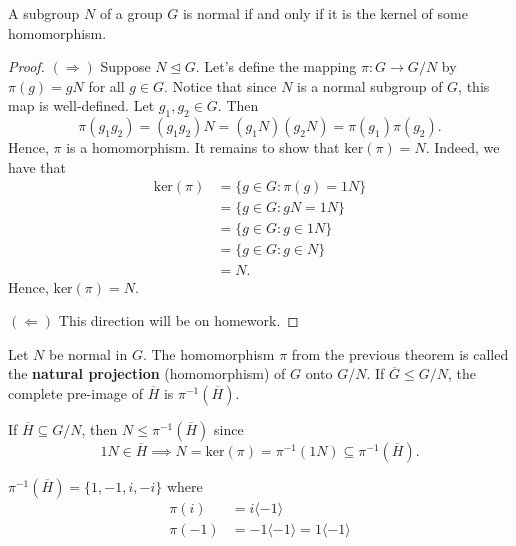 \begin{theorem}[Big!]
    A subgroup \( N \) of a group \( G  \) is normal if and only if it is the kernel of some homomorphism.
\end{theorem}
\begin{proof}
\( (\Longrightarrow) \) Suppose \( N \trianglelefteq G  \). Let's define the mapping \( \pi : G \to G /N  \) by \( \pi (g) = g N  \) for all \( g \in G  \). Notice that since \( N  \) is a normal subgroup of \( G  \), this map is well-defined. Let \( {g}_{1}, {g}_{2} \in G  \). Then 
\[  \pi({g}_{1} {g}_{2}) = ({g}_{1} {g}_{2}) N = ({g}_{1}N) ({g}_{2} N ) = \pi({g}_{1}) \pi({g}_{2}). \]
Hence, \( \pi  \) is a homomorphism. It remains to show that \( \text{ker}(\pi) = N  \). Indeed, we have that 
\begin{align*}
    \text{ker}(\pi) &= \{  g \in G : \pi(g) = 1N \}  \\
                    &= \{ g \in G : g N = 1 N  \}  \\
                    &= \{ g \in G : g \in 1N \}  \\
                    &= \{ g \in G : g \in N  \}  \\
                    &= N. 
\end{align*}
Hence, \( \text{ker}(\pi) = N  \).

\( (\Longleftarrow) \) This direction will be on homework.
\end{proof}

\begin{definition}
    Let \( N  \) be normal in \( G  \). The homomorphism \( \pi  \) from the previous theorem is called the \textbf{natural projection} (homomorphism) of \( G  \) onto \( G / N  \). If \( \overline{G} \leq G / N  \), the complete pre-image of \( \overline{H} \) is \( \pi^{-1}(\overline{H}) \).
\end{definition}

\begin{remark}
    If \( \overline{H} \subseteq  G / N  \), then \( N \leq \pi^{-1}(\overline{H}) \) since 
    \[  1 N \in \overline{H} \implies N = \text{ker}(\pi) = \pi^{-1}(1N) \subseteq  \pi^{-1}(\overline{H}). \]
\end{remark}

\begin{eg}
  \( \pi^{-1}(\overline{H}) = \{  1 , -1 , i , - i  \}  \) where   
  \begin{align*}
      \pi(i) &= i \langle - 1 \rangle   \\
      \pi(-1) &= - 1 \langle -1 \rangle = 1 \langle -1 \rangle
  \end{align*}
\end{eg}

